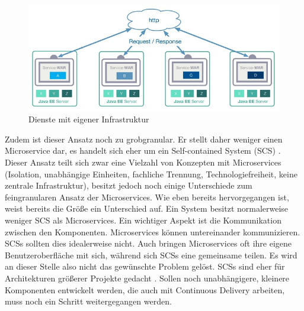 \begin{figure}[h!]
	\centering
	\includegraphics[width=1.0\linewidth]{images/mp2}
	\caption{Dienste mit eigener Infrastruktur \cite{LarsRowekamp.2017d}}
	\label{fig:mp22}
\end{figure}
Zudem ist dieser Ansatz noch zu grobgranular. Er stellt daher weniger einen Microservice dar, es handelt sich eher um ein Self-contained System (SCS) \cite{jaxcenter.2016}. Dieser Ansatz teilt sich zwar eine Vielzahl von Konzepten mit Microservices (Isolation, unabhängige Einheiten, fachliche Trennung, Technologiefreiheit, keine zentrale Infrastruktur), besitzt jedoch noch einige Unterschiede zum feingranularen Ansatz der Microservices. Wie eben bereits hervorgegangen ist, weist bereits die Größe ein Unterschied auf. Ein System besitzt normalerweise weniger SCS als Microservices. Ein wichtiger Aspekt ist die Kommunikation zwischen den Komponenten. Microservices können untereinander kommunizieren. SCSs sollten dies idealerweise nicht. Auch bringen Microservices oft ihre eigene Benutzeroberfläche mit sich, während sich SCSs eine gemeinsame teilen. Es wird an dieser Stelle also nicht das gewünschte Problem gelöst. SCSs sind eher für Architekturen größerer Projekte gedacht \cite{selfcontainedservices.2017}. Sollen noch unabhängigere, kleinere Komponenten entwickelt werden, die auch mit Continuous Delivery arbeiten, muss noch ein Schritt weitergegangen werden.

 